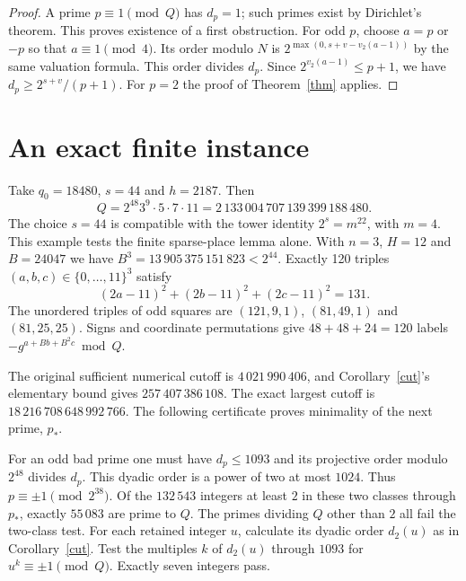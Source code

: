 \documentclass[11pt]{article}
\begin{document}
\begin{proof}
A prime $p\equiv1\pmod Q$ has $d_p=1$; such primes exist by Dirichlet's
theorem. This proves existence of a first obstruction. For odd $p$, choose
$a=p$ or $-p$ so that $a\equiv1\pmod4$. Its order modulo $N$ is
$2^{\max(0,s+v-v_2(a-1))}$ by the same valuation formula.
This order divides $d_p$. Since $2^{v_2(a-1)}\le p+1$, we have
$d_p\ge 2^{s+v}/(p+1)$. For $p=2$ the proof of Theorem~\ref{thm} applies.
\end{proof}

\section{An exact finite instance}

Take $q_0=18480$, $s=44$ and $h=2187$. Then
\[
 Q=2^{48}3^9\cdot5\cdot7\cdot11
 =2\,133\,004\,707\,139\,399\,188\,480.
\]
The choice $s=44$ is compatible with the tower identity $2^s=m^{22}$, with
$m=4$. This example tests the finite sparse-place lemma alone.
With $n=3$, $H=12$ and $B=24047$ we have $B^3=13\,905\,375\,151\,823<2^{44}$.
Exactly 120 triples $(a,b,c)\in\{0,\ldots,11\}^3$ satisfy
\[
 (2a-11)^2+(2b-11)^2+(2c-11)^2=131.
\]
The unordered triples of odd squares are $(121,9,1)$, $(81,49,1)$ and
$(81,25,25)$. Signs and coordinate permutations give $48+48+24=120$
labels $-g^{a+Bb+B^2c}\bmod Q$.

The original sufficient numerical cutoff is $4\,021\,990\,406$, and
Corollary~\ref{cut}'s elementary bound gives $257\,407\,386\,108$. The
exact largest cutoff is $18\,216\,708\,648\,992\,766$. The following
certificate proves minimality of the next prime, $p_*$.

For an odd bad prime one must have $d_p\le1093$ and its projective order
modulo $2^{48}$ divides $d_p$. This dyadic order is a power of two at most
$1024$. Thus $p\equiv\pm1\pmod{2^{38}}$. Of the $132\,543$ integers
at least $2$ in these two classes through $p_*$, exactly $55\,083$ are prime
to $Q$. The primes dividing $Q$ other than $2$ all fail the two-class test.
For each retained integer $u$, calculate its dyadic order $d_2(u)$ as in
Corollary~\ref{cut}. Test the multiples $k$ of $d_2(u)$ through $1093$ for
$u^k\equiv\pm1\pmod Q$. Exactly seven integers pass.
\end{document}
